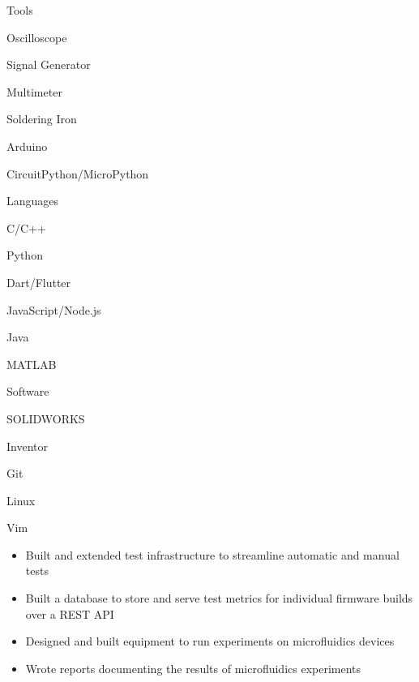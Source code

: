 \documentclass{resume}
\author{Jasper Chan}
\begin{document}
\maketitle

\vspace{-1em} %
\TechnicalSkills

\begin{TechSkills}{Tools}
    \item Oscilloscope
    \item Signal Generator
    \item Multimeter
    \item Soldering Iron
    \item Arduino
    \item CircuitPython/MicroPython
\end{TechSkills}
\begin{TechSkills}{Languages}
    \item C/C++
    \item Python
    \item Dart/Flutter
    \item JavaScript/Node.js
    \item Java
    \item MATLAB
\end{TechSkills}
\begin{TechSkills}{Software}
    \item SOLIDWORKS
    \item Inventor
    \item Git
    \item Linux
    \item Vim
\end{TechSkills}

\CoopStatus


\CoopWorkExperience

\begin{itemize}
    \item Built and extended test infrastructure to streamline automatic and manual tests
    \item Built a database to store and serve test metrics for individual firmware builds over a REST API
\end{itemize}

\begin{itemize}
    \item Designed and built equipment to run experiments on microfluidics devices
    \item Wrote reports documenting the results of microfluidics experiments
\end{itemize}
\end{document}
